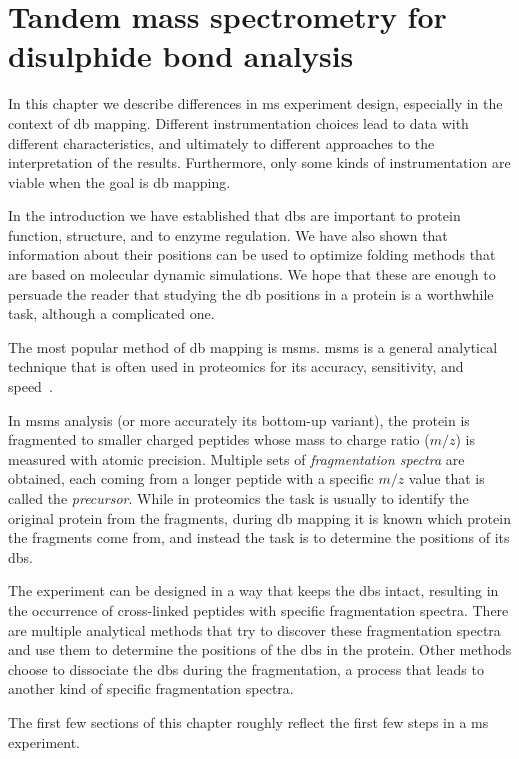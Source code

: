 \chapter{Tandem mass spectrometry for disulphide bond analysis}

In this chapter we describe differences in \gls*{ms} experiment design, especially in the context of \gls*{db} mapping. Different instrumentation choices lead to data with different characteristics, and ultimately to different approaches to the interpretation of the results. Furthermore, only some kinds of instrumentation are viable when the goal is \gls*{db} mapping.

In the introduction we have established that \glspl*{db} are important to protein function, structure, and to enzyme regulation. We have also shown that information about their positions can be used to optimize folding methods that are based on molecular dynamic simulations. We hope that these are enough to persuade the reader that studying the \gls*{db} positions in a protein is a worthwhile task, although a complicated one.

The most popular method of \gls*{db} mapping is \gls*{msms}. \gls*{msms} is a general analytical technique that is often used in proteomics for its accuracy, sensitivity, and speed~\cite{gorman2002protein}.

In \gls*{msms} analysis (or more accurately its bottom-up variant), the protein is fragmented to smaller charged peptides whose mass to charge ratio (\(m/z\)) is measured with atomic precision. Multiple sets of \emph{fragmentation spectra} are obtained, each coming from a longer peptide with a specific \(m/z\) value that is called the \emph{precursor}. While in proteomics the task is usually to identify the original protein from the fragments, during \gls*{db} mapping it is known which protein the fragments come from, and instead the task is to determine the positions of its \glspl*{db}.

The experiment can be designed in a way that keeps the \glspl*{db} intact, resulting in the occurrence of cross-linked peptides with specific fragmentation spectra. There are multiple analytical methods that try to discover these fragmentation spectra and use them to determine the positions of the \glspl*{db} in the protein. Other methods choose to dissociate the \glspl*{db} during the fragmentation, a process that leads to another kind of specific fragmentation spectra.

The first few sections of this chapter roughly reflect the first few steps in a \gls*{ms} experiment.

